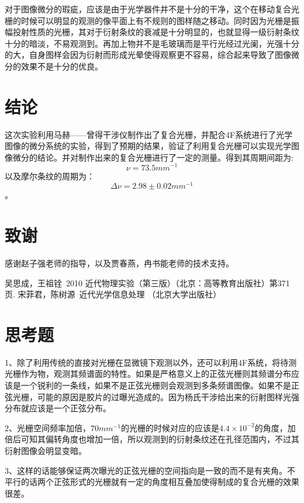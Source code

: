 \documentclass[aps,pre,12pt,preprint,onecolumn,showpacs,showkeys,UTF8]{revtex4-1}
\begin{document}
对于图像微分的瑕疵，应该是由于光学器件并不是十分的干净，这个在移动复合光栅的时候可以明显的观测的像平面上有不规则的图样随之移动。同时因为光栅是振幅投射性质的光栅，其对于衍射条纹的衰减是十分明显的，也就显得一级衍射条纹十分的暗淡，不易观测到。再加上物并不是毛玻璃而是平行光经过光阑，光强十分的大，自身图样会因为衍射而形成光晕使得观察更不容易，综合起来导致了图像微分的效果不是十分的优良。

\section{结论}

这次实验利用马赫——曾得干涉仪制作出了复合光栅，并配合4F系统进行了光学图像的微分系统的实验，得到了预期的结果，验证了利用复合光栅可以实现光学图像微分的结论。并对制作出来的复合光栅进行了一定的测量。得到其周期间距为:
$$\nu=73.5mm^{-1}$$
以及摩尔条纹的周期为：
$$\Delta\nu=2.98 \pm 0.02 mm^{-1}$$。

 
\section{致谢}
感谢赵子强老师的指导，以及贾春燕，冉书能老师的技术支持。



\begin{thebibliography}{}
	 吴思成，王祖铨~2010 近代物理实验（第三版）（北京：高等教育出版社）第371页.
	 宋菲君，陈树源~近代光学信息处理 （北京大学出版社） 
%
%
\end{thebibliography}

\clearpage
\appendix
\section{思考题}

	1、除了利用传统的直接对光栅在显微镜下观测以外，还可以利用4F系统，将待测光栅作为物，观测其频谱面的特性。如果是严格意义上的正弦光栅则其频谱分布应该是一个锐利的一条线，如果不是正弦光栅则会观测到多条频谱图像。如果不是正弦光栅，可能的原因是胶片的过曝光造成的。因为杨氏干涉给出来的衍射图样光强分布就应该是一个正弦分布。

	2、光栅空间频率加倍，$70mm^{-1}$的光栅的时候对应的应该是$4.4\times10^{-2}$的角度，加倍后可知其偏转角度也增加一倍，所以观测到的衍射条纹还在孔径范围内，不过其衍射图像会明显变暗。

	3、这样的话能够保证两次曝光的正弦光栅的空间指向是一致的而不是有夹角。不平行的话两个正弦形式的光栅就有一定的角度相互叠加使得制成的复合光栅的效果很差。
\end{document}

